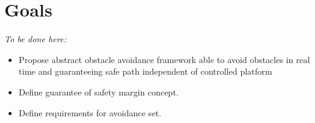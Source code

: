 \section{Goals}\label{s:goals}
    \emph{To be done here:}
    \begin{itemize}
        \item Propose abstract obstacle avoidance framework able to avoid obstacles in real time and guaranteeing safe path independent of controlled platform
        \item Define guarantee of safety margin concept.
        \item Define requirements for avoidance set.
    \end{itemize}